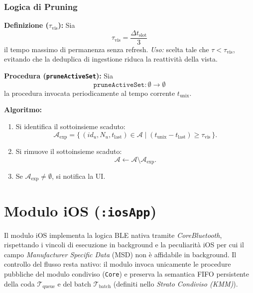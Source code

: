 \documentclass[a4paper,11pt,table,dvipsnames]{article}
\begin{document}
\subsubsection{Logica di Pruning}

\textbf{Definizione (\(\tau_{\text{vis}}\)):}
Sia
\[
    \tau_{\text{vis}} = \frac{\Delta t_{\text{slot}}}{3}
\]
il tempo massimo di permanenza senza refresh.
\emph{Uso:} scelta tale che \(\tau < \tau_{\text{vis}}\), evitando che la deduplica di ingestione riduca la reattività della vista.

\textbf{Procedura (\texttt{pruneActiveSet}):}
Sia
\[
    \texttt{pruneActiveSet}: \emptyset \rightarrow \emptyset
\]
la procedura invocata periodicamente al tempo corrente \(t_{\text{unix}}\).

\textbf{Algoritmo:}
\begin{enumerate}
    \item Si identifica il sottoinsieme scaduto:
          \[
              \mathcal{A}_{\text{exp}}
              =
              \{\, (id_u,N_u,t_{\text{last}})\in\mathcal{A}
              \mid (t_{\text{unix}} - t_{\text{last}}) \ge \tau_{\text{vis}} \,\}.
          \]

    \item Si rimuove il sottoinsieme scaduto:
          \[
              \mathcal{A} \leftarrow \mathcal{A} \setminus \mathcal{A}_{\text{exp}}.
          \]

    \item Se \(\mathcal{A}_{\text{exp}} \neq \emptyset\), si notifica la UI.
\end{enumerate}

\section{Modulo iOS (\texttt{:iosApp})}
Il modulo iOS implementa la logica BLE nativa tramite \emph{CoreBluetooth}, rispettando i vincoli di esecuzione in background e la peculiarità iOS per cui il campo \emph{Manufacturer Specific Data} (MSD) non è affidabile in background. Il controllo del flusso resta nativo: il modulo invoca unicamente le procedure pubbliche del modulo condiviso (\texttt{Core}) e preserva la semantica FIFO persistente della coda \(\mathcal{T}_{\text{queue}}\) e del batch \(\mathcal{T}_{\text{batch}}\) (definiti nello \emph{Strato Condiviso (KMM)}).
\end{document}
